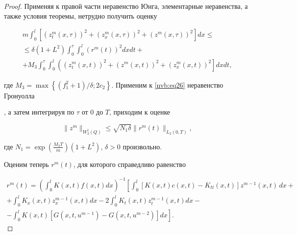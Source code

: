 \begin{proof}
Применяя к правой части неравенство Юнга, элементарные неравенства, а также условия теоремы, нетрудно получить оценку

    \begin{multline}\label{nvb:eq26}

    m\int _0^l  \left[ \left( z^{m}_{t}(x,\tau)\right)^2{+} \left( z^{m}_x(x,\tau)\right)^2 {+}\left( z^{m}(x,\tau)\right)^2\right] dx \leq \\

    \leq \delta \left(1{+}L^2\right)  \int _0^\tau\int _0^l \left( r^m(t)\right)^2 dx dt{+}\\

 +    M_3\int _0^\tau\int _0^l \left( \left(z^{m}_{t}(x,t)\right)^2 +\left(z^{m}(x,t)\right)^2

+\left(z^{m}_{x}(x,t)\right)^2 \right] dx dt,

    \end{multline}

где $M_3=\max\left\lbrace ({f_1^2+1})/{\delta}; 2c_2\right\rbrace.$ Применим к \eqref{nvb:eq26} неравенство Гронуолла

\cite{gor}, а затем интегрируя по  $\tau$ от $0$ до $T$, приходим к оценке

    \begin{equation}\label{nvb:eq27}

    \|z^m\|_{W_2^{1}(Q)} \leq \sqrt{N_1\delta} \|r^m(t)\|_{L_2(0,T)},

    \end{equation}

где $N_1=\exp({\frac{M_3T}{m}})(1+L^2)$, $\delta>0$ произвольно.



Оценим теперь $r^m(t)$, для которого справедливо равенство

    \begin{multline}

      r^m(t)=\left( \int _0^l K(x,t) f(x,t) dx\right)^{-1}\left[ \int _0^l\left[K(x,t)c(x,t)-K_{tt}(x,t) \right]z^{m-1}(x,t) \,

      dx+\right.\\

     \label{nvb:eq28}

       +\left. \int _0^l K_x(x,t) z_x^{m-1}(x,t) dx -2\int _0^l K_t(x,t) z_t^{m-1}(x,t) dx-\right.\\

     \left.-\int _0^l K(x,t) \left[ G(x,t,u^{m-1})-G(x,t,u^{m-2})\right]  dx\right].

       \end{multline}




\end{proof}
